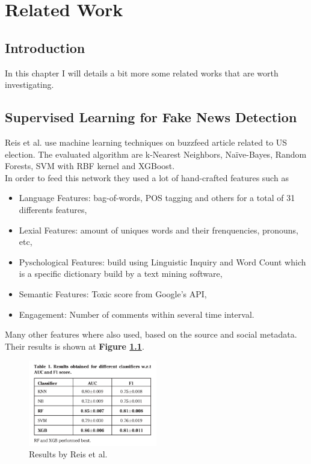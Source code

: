 \chapter{Related Work}
\section{Introduction}
In this chapter I will details a bit more some related works that are worth investigating. 
\section{Supervised Learning for Fake News Detection\cite{Reis2019}}
Reis et al. use machine learning techniques on buzzfeed article related to US election. The evaluated algorithm are k-Nearest Neighbors, Na\"ive-Bayes, Random Forests, SVM with RBF kernel and XGBoost. \\

In order to feed this network they used a lot of hand-crafted features such as 
\begin{itemize}
	\item Language Features: bag-of-words, POS tagging and others for a total of 31 differents features,
	\item Lexial Features: amount of uniques words and their frenquencies, pronouns, etc,
	\item Pyschological Features\cite{Pennebaker2001}: build using Linguistic Inquiry and Word Count which is a specific dictionary build by a text mining software,
	\item Semantic Features: Toxic score from Google's API,
	\item Engagement: Number of comments within several time interval.
\end{itemize}

Many other features where also used, based on the source and social metadata. \\

Their results is shown at \textbf{Figure \ref{fig:chap1:reis}}.

\begin{figure}[h]
	\centering
	\includegraphics[width=0.5\textwidth]{images/chap1_bis/rev1.png}
	\caption{Results by Reis et al. }
	\label{fig:chap1:reis}
\end{figure}

